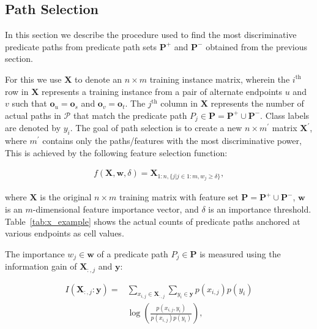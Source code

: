 \documentclass[reprint,twocolumn,showpacs,preprintnumbers,amsmath, aps,pre,amssymb]{revtex4-1}
\begin{document}
\subsection{Path Selection} \label{sec:path_selection}

In this section we describe the procedure used to find the most discriminative predicate paths from predicate path sets $\mathbf{P}^{+}$ and $\mathbf{P}^{-}$ obtained from the previous section.%

For this we use $\mathbf{X}$ to denote an $n \times m$ training instance matrix, wherein the $i^{\textrm{th}}$ row in $\mathbf{X}$ represents a training instance from a pair of alternate endpoints $u$ and $v$ such that $\mathbf{o}_u=\mathbf{o}_s$ and $\mathbf{o}_v=\mathbf{o}_t$. The $j^{\textrm{th}}$ column in $\mathbf{X}$ represents the number of actual paths in $\mathcal{P}$ that match the predicate path $P_j\in \mathbf{P} = \mathbf{P}^{+} \cup \mathbf{P}^{-}$. Class labels are denoted by $y_i$. The goal of path selection is to create a new $n \times m^\prime$ matrix $\mathbf{X^\prime}$, where $m^\prime$ contains only the paths/features with the most discriminative power, This is achieved by the following feature selection function:

\begin{equation}
\begin{split}
f(\mathbf{X},\mathbf{w},\delta) = \mathbf{X}_{1:n, \{ j | j \in 1:m, w_j \geq \delta \}},
\end{split}
\end{equation}

\noindent where $\mathbf{X}$ is the original $n \times m$ training matrix with feature set $\mathbf{P}=\mathbf{P}^{+} \cup \mathbf{P}^{-}$, $\mathbf{w}$ is an $m$-dimensional feature importance vector, and $\delta$ is an importance threshold. Table~\ref{tab:x_example} shows the actual counts of predicate paths anchored at various endpoints as cell values.

The importance $w_j\in\mathbf{w}$ of a predicate path $P_j\in\mathbf{P}$ is measured using the information gain of $\mathbf{X}_{:,j}$ and $\mathbf{y}$:

\begin{equation}
\begin{split}
I(\mathbf{X}_{:,j}:\mathbf{y}) = &
\sum_{x_{i,j} \in \mathbf{X}_{:,j}} \sum_{y_i \in \mathbf{y}} p(x_{i,j})p(y_i) \\
&  \log \left (\frac{p(x_{i,j},y_i)}{p(x_{i,j})p(y_{i})} \right ),
\end{split}
\end{equation}
\end{document}
